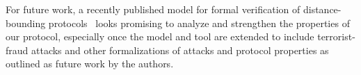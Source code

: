 For future work, a recently published model for formal verification of distance-bounding protocols~\cite{TamarinDB} looks promising to analyze and strengthen the properties of our protocol, especially once the model and tool are extended to include terrorist-fraud attacks and other formalizations of attacks and protocol properties as outlined as future work by the authors.

